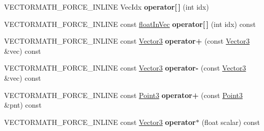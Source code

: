 \begin{DoxyCompactItemize}
\item 
\mbox{\label{classVectormath_1_1Aos_1_1Vector3_ac7873beab7df5fc972c52b45f78cebaa}} 
V\+E\+C\+T\+O\+R\+M\+A\+T\+H\+\_\+\+F\+O\+R\+C\+E\+\_\+\+I\+N\+L\+I\+NE Vec\+Idx {\bfseries operator\mbox{[}$\,$\mbox{]}} (int idx)
\item 
\mbox{\label{classVectormath_1_1Aos_1_1Vector3_ac2e26c51238f72bf70fe16507d505f33}} 
V\+E\+C\+T\+O\+R\+M\+A\+T\+H\+\_\+\+F\+O\+R\+C\+E\+\_\+\+I\+N\+L\+I\+NE const \hyperlink{classVectormath_1_1floatInVec}{float\+In\+Vec} {\bfseries operator\mbox{[}$\,$\mbox{]}} (int idx) const
\item 
\mbox{\label{classVectormath_1_1Aos_1_1Vector3_a44ed2c65d0cc969f1e1d3ae23a07303c}} 
V\+E\+C\+T\+O\+R\+M\+A\+T\+H\+\_\+\+F\+O\+R\+C\+E\+\_\+\+I\+N\+L\+I\+NE const \hyperlink{classVectormath_1_1Aos_1_1Vector3}{Vector3} {\bfseries operator+} (const \hyperlink{classVectormath_1_1Aos_1_1Vector3}{Vector3} \&vec) const
\item 
\mbox{\label{classVectormath_1_1Aos_1_1Vector3_a083ddccb7716ee66061b8f3dcd3afb4e}} 
V\+E\+C\+T\+O\+R\+M\+A\+T\+H\+\_\+\+F\+O\+R\+C\+E\+\_\+\+I\+N\+L\+I\+NE const \hyperlink{classVectormath_1_1Aos_1_1Vector3}{Vector3} {\bfseries operator-\/} (const \hyperlink{classVectormath_1_1Aos_1_1Vector3}{Vector3} \&vec) const
\item 
\mbox{\label{classVectormath_1_1Aos_1_1Vector3_a2412659ac4334e734c0b0ae88ee2e75d}} 
V\+E\+C\+T\+O\+R\+M\+A\+T\+H\+\_\+\+F\+O\+R\+C\+E\+\_\+\+I\+N\+L\+I\+NE const \hyperlink{classVectormath_1_1Aos_1_1Point3}{Point3} {\bfseries operator+} (const \hyperlink{classVectormath_1_1Aos_1_1Point3}{Point3} \&pnt) const
\item 
\mbox{\label{classVectormath_1_1Aos_1_1Vector3_a5c83c155da22bc27f0ff7862bd4d7b47}} 
V\+E\+C\+T\+O\+R\+M\+A\+T\+H\+\_\+\+F\+O\+R\+C\+E\+\_\+\+I\+N\+L\+I\+NE const \hyperlink{classVectormath_1_1Aos_1_1Vector3}{Vector3} {\bfseries operator$\ast$} (float scalar) const
\item 
\mbox{\label{classVectormath_1_1Aos_1_1Vector3_a65e208d1aa77e378803063744358b8d7}} 

\end{DoxyCompactItemize}
